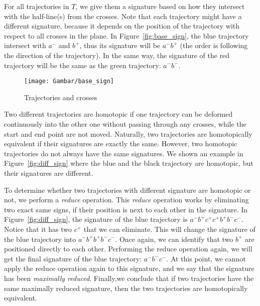 For all trajectories in $T$, we give them a signature based on how they intersect with the half-line(s) from the crosses. 
Note that each trajectory might have a different signature, because it depends on the position of the trajectory with respect to all crosses in the plane.
In Figure~\ref{fig:base_sign}, the blue trajectory intersect with \textit{$a^{-}$} and \textit{$b^{+}$}, thus its signature will be \textit{$a^{-}b^{+}$} (the order is following the direction of the trajectory). 
In the same way, the signature of the red trajectory will be the same as the green trajectory: \textit{$a^{-}b^{-}$}.

\begin{figure}
\centering
\texttt{[image: Gambar/base\_sign]}
\caption[Trajectories and crosses]{Trajectories and crosses} 
\end{figure}


Two different trajectories are homotopic if one trajectory can be deformed continuously into the other one without passing through any crosses, while the start and end point are not moved.
Naturally, two trajectories are homotopically equivalent if their signatures are exactly the same. 
However, two homotopic trajectories do not always have the same signatures.
We shown an example in Figure~\ref{fig:diff_sign} where the blue and the black trajectory are homotopic, but their signatures are different.

To determine whether two trajectories with different signature are homotopic or not, we perform a \textit{reduce} operation.
This \textit{reduce} operation works by eliminating two exact same signs, if their position is next to each other in the signature.
In Figure~\ref{fig:diff_sign}, the signature of the blue trajectory is \textit{$a^{-}b^{+}c^{+}c^{+}b^{+}b^{-}c^{-}$}.
Notice that it has two \textit{$c^{+}$} that we can eliminate.
This will change the signature of the blue trajectory into \textit{$a^{-}b^{+}b^{+}b^{-}c^{-}$}.
Once again, we can identify that two \textit{$b^{+}$} are positioned directly to each other. 
Performing the reduce operation again, we will get the final signature of the blue trajectory: \textit{$a^{-}b^{-}c^{-}$}.
At this point, we cannot apply the reduce operation again to this signature, and we say that the signature has been \textit{maximally reduced}.
Finally,we conclude that if two trajectories have the same maximally reduced signature, then the two trajectories are homotopically equivalent.  

